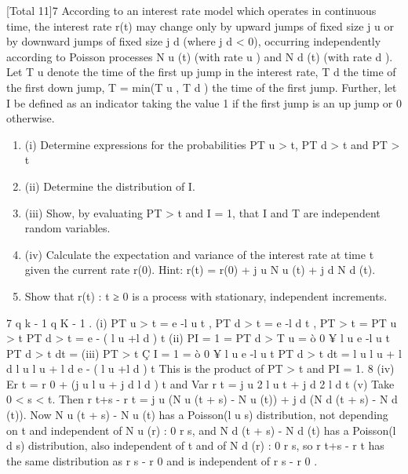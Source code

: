 \usepackage{vmargin}
\usepackage{amsmath}
\usepackage{graphics}
\usepackage{epsfig}
\usepackage{enumerate}
\usepackage{multicol}
\usepackage{subfigure}
\usepackage{fancyhdr}
\usepackage{listings}
\usepackage{framed}
\usepackage{graphicx}
\usepackage{amsmath}
\usepackage{chngpage}

\usepackage{vmargin}



\setmargins{2.0cm}{2.5cm}{16 cm}{22cm}{0.5cm}{0cm}{1cm}{1cm}

\renewcommand{\baselinestretch}{1.3}

\setcounter{MaxMatrixCols}{10}



[Total 11]7
According to an interest rate model which operates in continuous time, the
interest rate r(t) may change only by upward jumps of fixed size j u or by
downward jumps of fixed size j d (where j d < 0), occurring independently according
to Poisson processes N u (t) (with rate \lambda u ) and N d (t) (with rate \lambda d ).
Let T u denote the time of the first up jump in the interest rate, T d the time of the
first down jump, T = min(T u , T d ) the time of the first jump. Further, let I be
defined as an indicator taking the value 1 if the first jump is an up jump or 0
otherwise.
\begin{enumerate}
\item (i) Determine expressions for the probabilities P{T u > t}, P{T d > t} and P{T > t}
\item 
(ii) Determine the distribution of I.
\item 
(iii) Show, by evaluating P{T > t and I = 1}, that I and T are independent
random variables.
\item 
(iv) Calculate the expectation and variance of the interest rate at time t given
the current rate r(0).
Hint: r(t) = r(0) + j u N u (t) + j d N d (t).
\item 
Show that {r(t) : t ≥ 0} is a process with stationary, independent
increments.
\end{enumerate}
\newpage
7
q k - 1
q K - 1
.
(i) P{T u > t} = e -l u t , P{T d > t} = e -l d t , P{T > t} = P{T u > t} P{T d > t} = e - ( l u +l d ) t
(ii) P{I = 1} = P{T d > T u } = ò 0 ¥ l u e -l u t P{T d > t} dt =
(iii) P{T > t Ç I = 1} = ò 0 ¥ l u e -l u t P{T d > t} dt =
l u
l u + l d
l u
l u + l d
e - ( l u +l d ) t
This is the product of P{T > t} and P{I = 1}.
8
(iv) Er t = r 0 + (j u l u + j d l d ) t and Var r t = j u 2 l u t + j d 2 l d t
(v) Take 0 < s < t. Then r t+s - r t = j u (N u (t + s) - N u (t)) + j d (N d (t + s) - N d (t)).
Now N u (t + s) - N u (t) has a Poisson(l u s) distribution, not depending on t
and independent of {N u (r) : 0 \leq r \leq s}, and N d (t + s) - N d (t) has a
Poisson(l d s) distribution, also independent of t and of {N d (r) : 0 \leq r \leq s}, so
r t+s - r t has the same distribution as r s - r 0 and is independent of r s - r 0 .

